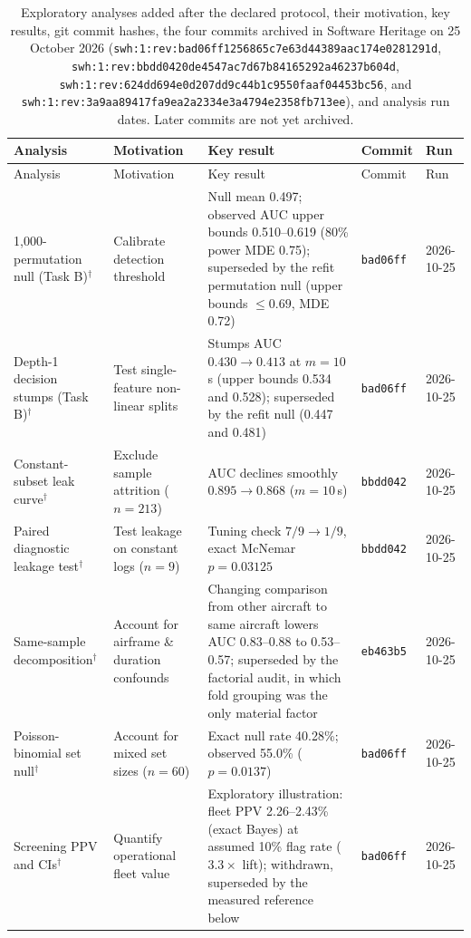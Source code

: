 \documentclass[preprint,12pt]{elsarticle}
\begin{document}
{\scriptsize\setlength{\tabcolsep}{2.5pt}
\begin{longtable}{@{}p{}p{}p{}p{}p{}@{}}
\caption{Exploratory analyses added after the declared protocol, their motivation, key results, git commit hashes, the four commits archived in Software Heritage on 25 October 2026 (\nolinkurl{swh:1:rev:bad06ff1256865c7e63d44389aac174e0281291d}, \nolinkurl{swh:1:rev:bbdd0420de4547ac7d67b84165292a46237b604d}, \nolinkurl{swh:1:rev:624dd694e0d207dd9c44b1c9550faaf04453bc56}, and \nolinkurl{swh:1:rev:3a9aa89417fa9ea2a2334e3a4794e2358fb713ee}), and analysis run dates. Later commits are not yet archived.}\label{tab:posthoc}\\
\toprule
Analysis & Motivation & Key result & Commit & Run \\
\midrule
\endfirsthead
\toprule
Analysis & Motivation & Key result & Commit & Run \\
\midrule
\endhead
1,000-permutation null (Task B)$^\dagger$ & Calibrate detection threshold & Null mean 0.497; observed AUC upper bounds 0.510--0.619 (80\% power MDE 0.75); superseded by the refit permutation null (upper bounds $\le 0.69$, MDE 0.72) & \texttt{bad06ff} & 2026-10-25 \\
Depth-1 decision stumps (Task B)$^\dagger$ & Test single-feature non-linear splits & Stumps AUC $0.430 \to 0.413$ at $m=10$\,s (upper bounds 0.534 and 0.528); superseded by the refit null (0.447 and 0.481) & \texttt{bad06ff} & 2026-10-25 \\
Constant-subset leak curve$^\dagger$ & Exclude sample attrition ($n=213$) & AUC declines smoothly $0.895 \to 0.868$ ($m=10$\,s) & \texttt{bbdd042} & 2026-10-25 \\
Paired diagnostic leakage test$^\dagger$ & Test leakage on constant logs ($n=9$) & Tuning check $7/9 \to 1/9$, exact McNemar $p=0.03125$ & \texttt{bbdd042} & 2026-10-25 \\
Same-sample decomposition$^\dagger$ & Account for airframe \& duration confounds & Changing comparison from other aircraft to same aircraft lowers AUC 0.83--0.88 to 0.53--0.57; superseded by the factorial audit, in which fold grouping was the only material factor & \texttt{eb463b5} & 2026-10-25 \\
Poisson-binomial set null$^\dagger$ & Account for mixed set sizes ($n=60$) & Exact null rate 40.28\%; observed 55.0\% ($p=0.0137$) & \texttt{bad06ff} & 2026-10-25 \\
Screening PPV and CIs$^\dagger$ & Quantify operational fleet value & Exploratory illustration: fleet PPV 2.26--2.43\% (exact Bayes) at assumed 10\% flag rate ($3.3\times$ lift); withdrawn, superseded by the measured reference below & \texttt{bad06ff} & 2026-10-25 \\

\end{longtable}}
\end{document}
